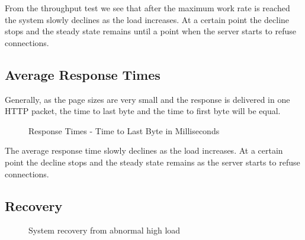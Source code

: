 From the throughput test we see that after the maximum work rate is reached the system slowly declines as the load increases. At a certain point the decline stops and the steady state remains until a point when the server starts to refuse connections. 


\subsection*{Average Response Times} 
Generally, as the page sizes are very small and the response is delivered in one HTTP packet, the time to last byte and the time to first byte will be equal.

\begin{figure}[h]
\centering
{}
\caption{Response Times - Time to Last Byte in Milliseconds}
\label{fig:5.3}
\end{figure}

The average response time slowly declines as the load increases. At a certain point the decline stops and the steady state remains as the server starts to refuse connections.


\subsection*{Recovery} 

\begin{figure}[h]
\centering
{}
\caption{System recovery from abnormal high load}
\label{fig:5.2}
\end{figure}

